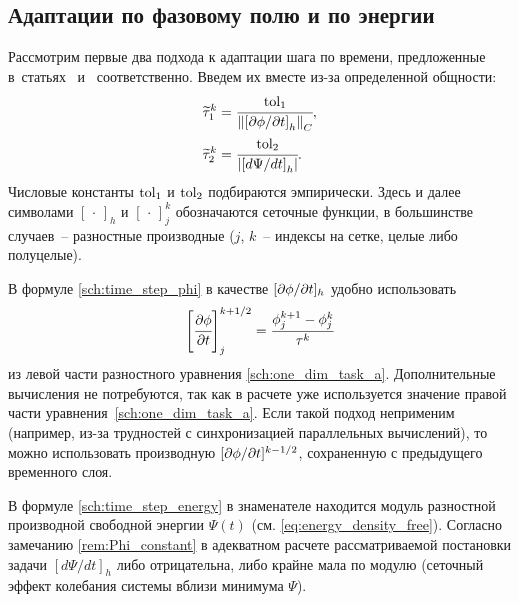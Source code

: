 \subsection{Адаптации по фазовому полю и по энергии}

Рассмотрим первые два подхода к адаптации шага по времени, предложенные в~статьях~\cite{li_time_step} и~\cite{zhang_time_step} соответственно. Введем их вместе из-за определенной общности:
\begin{align}
    \widetilde{\tau}_1^k & = \cfrac{{\text{tol}}_1}{\left\| \left[ \partial \phi / \partial t \right]_h \right\|_C},
    \label{sch:time_step_phi} \\
    \widetilde{\tau}_2^k & = \cfrac{{\text{tol}}_2}{\left| \left[ d \Psi / dt \right]_h \right|}.
    \label{sch:time_step_energy}
\end{align}
Числовые константы ${\text{tol}}_1$ и ${\text{tol}}_2$ подбираются эмпирически. Здесь и далее символами $[\, \cdot \,]_h$ и $[\, \cdot \,]_j^k$ обозначаются сеточные функции, в большинстве случаев~-- разностные производные ($j$, $k$~-- индексы на сетке, целые либо полуцелые).

В формуле \eqref{sch:time_step_phi} в качестве $[\partial \phi / \partial t]_h$ удобно использовать
\[
    \left[ \cfrac{\partial \phi}{\partial t} \right]_j^{k + 1/2} = \cfrac{\phi_j^{k + 1} - \phi_j^k}{\tau^k}
\]
из левой части разностного уравнения \eqref{sch:one_dim_task_a}. Дополнительные вычисления не потребуются, так как в расчете уже используется значение правой части уравнения~\eqref{sch:one_dim_task_a}. Если такой подход неприменим (например, из-за трудностей с синхронизацией параллельных вычислений), то можно использовать производную $[\partial \phi / \partial t]^{k - 1/2}$, сохраненную с предыдущего временного слоя.

В формуле \eqref{sch:time_step_energy} в знаменателе находится модуль разностной производной свободной энергии $\Psi(t)$ (см. \eqref{eq:energy_density_free}). Согласно замечанию \ref{rem:Phi_constant} в адекватном расчете рассматриваемой постановки задачи $[d \Psi / dt]_h$ либо отрицательна, либо крайне мала по модулю (сеточный эффект колебания системы вблизи минимума $\Psi$).

